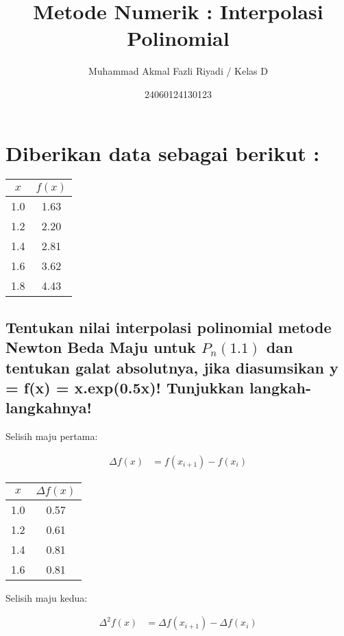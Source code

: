 \documentclass{article}
\title{Metode Numerik : Interpolasi Polinomial}
\author{Muhammad Akmal Fazli Riyadi / Kelas D}
\date{24060124130123}
\begin{document}
\maketitle

\section{Diberikan data sebagai berikut :}

\begin{center}
\begin{tabular}{|c|c|}
    \hline
    $x$ & $f(x)$ \\
    \hline
    1.0 & 1.63 \\
    1.2 & 2.20 \\
    1.4 & 2.81 \\
    1.6 & 3.62 \\
    1.8 & 4.43 \\
    \hline
\end{tabular}
\end{center}

\subsection{Tentukan nilai interpolasi polinomial metode Newton Beda Maju untuk $P_n(1.1)$ dan
tentukan galat absolutnya, jika diasumsikan y = f(x) = x.exp(0.5x)! Tunjukkan langkah-langkahnya!}

Selisih maju pertama:

\begin{align*}
    \Delta f(x) &= f(x_{i+1}) - f(x_i)
\end{align*}

\begin{center}
\begin{tabular}{|c|c|}
    \hline
    $x$ & $\Delta f(x)$ \\
    \hline
    1.0 & 0.57 \\
    1.2 & 0.61 \\
    1.4 & 0.81 \\
    1.6 & 0.81 \\
    \hline
\end{tabular}
\end{center}

Selisih maju kedua:

\begin{align*}
    \Delta^2 f(x) &= \Delta f(x_{i+1}) - \Delta f(x_i)
\end{align*}
\end{document}

